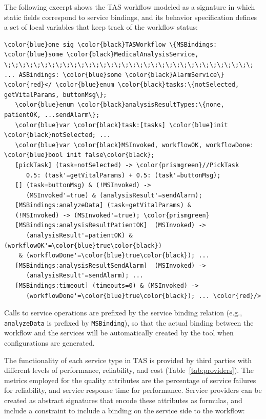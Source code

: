 \documentclass[10pt,journal,compsoc]{IEEEtran}
\begin{document}
\smallskip
The following excerpt shows the TAS workflow modeled as a signature in which static fields correspond to service bindings, and its behavior specification defines a set of local variables that keep track of the workflow status:

{\scriptsize
\begin{Verbatim}[commandchars=\\\{\},codes={\catcode`$=3\catcode`^=7\catcode`_=8}]
\color{blue}one sig \color{black}TASWorkflow \{MSBindings: \color{blue}some \color{black}MedicalAnalysisService, 
\;\;\;\;\;\;\;\;\;\;\;\;\;\;\;\;\;\;\;\;\;\;\;\;\;\;\;\;\;\;\;\;\;\; ... ASBindings: \color{blue}some \color{black}AlarmService\}
\color{red}</ \color{blue}enum \color{black}tasks:\{notSelected, getVitalParams, buttonMsg\};
   \color{blue}enum \color{black}analysisResultTypes:\{none, patientOK, ...sendAlarm\};
   \color{blue}var \color{black}task:[tasks] \color{blue}init \color{black}notSelected; ...
   \color{blue}var \color{black}MSInvoked, workflowOK, workflowDone: \color{blue}bool init false\color{black};
   [pickTask] (task=notSelected) -> \color{prismgreen}//PickTask
      0.5: (task'=getVitalParams) + 0.5: (task'=buttonMsg);
   [] (task=buttonMsg) & (!MSInvoked) -> 
      (MSInvoked'=true) & (analysisResult'=sendAlarm); 
   [MSBindings:analyzeData] (task=getVitalParams) & 
   (!MSInvoked) -> (MSInvoked'=true); \color{prismgreen}
   [MSBindings:analysisResultPatientOK]  (MSInvoked) -> 
      (analysisResult'=patientOK) & (workflowOK'=\color{blue}true\color{black}) 
    & (workflowDone'=\color{blue}true\color{black}); ...
   [MSBindings:analysisResultSendAlarm]  (MSInvoked) -> 
      (analysisResult'=sendAlarm); ...
   [MSBindings:timeout] (timeouts=0) & (MSInvoked) -> 
      (workflowDone'=\color{blue}true\color{black}); ... \color{red}/>
\end{Verbatim}
}

Calls to service operations are prefixed by the service binding relation (e.g., {\tt analyzeData} is prefixed by {\tt MSBinding}), so that the actual binding between the workflow and the services will be automatically created by the tool when configurations are generated.

The functionality of each service type in TAS is provided by third parties with different levels of performance, reliability, and cost (Table~\ref{tab:providers}). The metrics employed for the quality attributes are the percentage of service failures for reliability, and service response time for performance.
Service providers can be created as abstract signatures that encode these attributes as formulas, and include a constraint to include a binding on the service side to the workflow:
\end{document}
